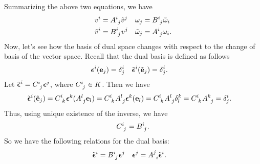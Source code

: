 Summarizing the above two equations, we have
\begin{align}
    v^i         & = \tensor{A}{^i_j} \tilde{v}^j &  & \omega_j = \tensor{B}{^i_j} \tilde{\omega}_i  \\
    \tilde{v}^i & = \tensor{B}{^i_j} v^j         &  & \tilde{\omega}_j = \tensor{A}{^i_j} \omega_i.
\end{align}
Now, let's see how the basis of dual space changes with respect to the change of basis of the vector space. Recall that the dual basis is defined as follows
\begin{align}
    \vb*{\epsilon}^i(\vb{e}_j) & = \delta^i_j &  & \tilde{\vb*{\epsilon}}^i(\tilde{\vb{e}}_j) = \delta^i_j.
\end{align}
Let \(\tilde{\vb*{\epsilon}}^i = \tensor{C}{^i_j} \vb*{\epsilon}^j\), where \(\tensor{C}{^i_j} \in K\). Then we have
\begin{align}
    \tilde{\vb*{\epsilon}}^i(\tilde{\vb{e}}_j) & = \tensor{C}{^i_k} \vb*{\epsilon}^k(\tensor{A}{^l_j} \vb{e}_l) = \tensor{C}{^i_k} \tensor{A}{^l_j} \vb*{\epsilon}^k(\vb{e}_l) = \tensor{C}{^i_k} \tensor{A}{^l_j} \delta^k_l = \tensor{C}{^i_k} \tensor{A}{^k_j} = \delta^i_j.
\end{align}
Thus, using unique existence of the inverse, we have
\begin{equation}
    \tensor{C}{^i_j} = \tensor{B}{^i_j}.
\end{equation}
So we have the following relations for the dual basis:
\begin{align}
    \tilde{\vb*{\epsilon}}^i & = \tensor{B}{^i_j} \vb*{\epsilon}^j &  & \vb*{\epsilon}^j = \tensor{A}{^j_i} \tilde{\vb*{\epsilon}}^i.
\end{align}
